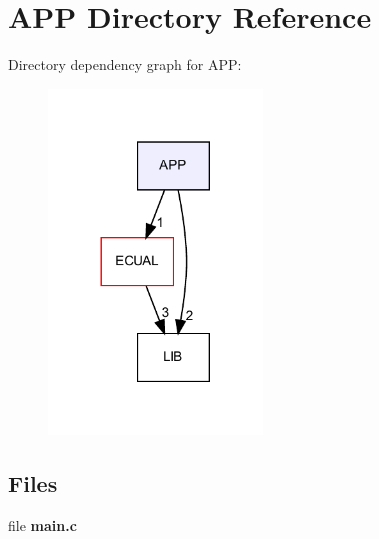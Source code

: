 \section{A\+PP Directory Reference}
\label{dir_0ca16891106f5a3e9ad635a0d6c5f98f}
Directory dependency graph for A\+PP\+:
\nopagebreak
\begin{figure}[H]
\begin{center}
\leavevmode
\includegraphics[width=161pt]{dir_0ca16891106f5a3e9ad635a0d6c5f98f_dep}
\end{center}
\end{figure}
\subsection*{Files}
\begin{DoxyCompactItemize}
\item 
file \textbf{ main.\+c}
\end{DoxyCompactItemize}

